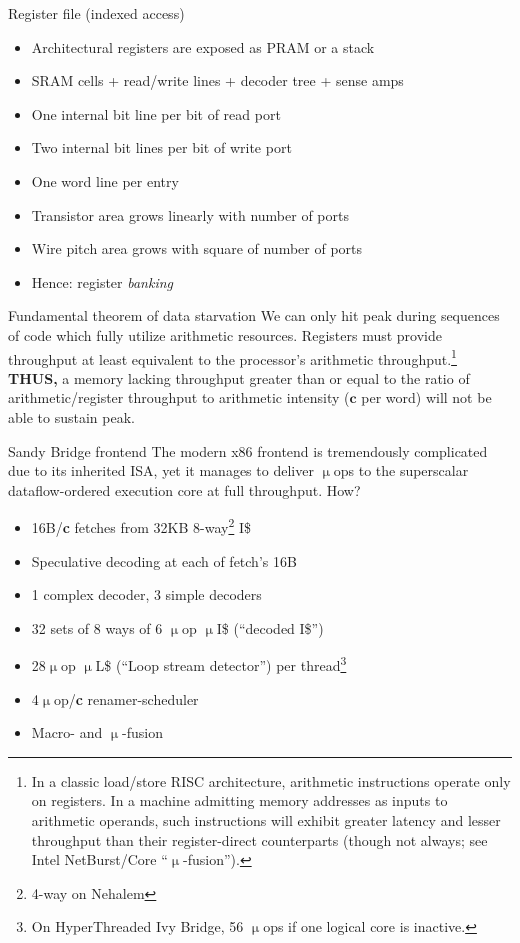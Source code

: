 \documentclass[mathserif,xcolor={dvipsnames,table}]{beamer}
\begin{document}
\begin{frame}{Register file (indexed access)}
\begin{itemize}
\item Architectural registers are exposed as PRAM or a stack
\item SRAM cells + read/write lines + decoder tree + sense amps
\item One internal bit line per bit of read port
\item Two internal bit lines per bit of write port
\item One word line per entry
\item Transistor area grows linearly with number of ports
\item Wire pitch area grows with square of number of ports
\item Hence: register \textit{banking}
\end{itemize}
\end{frame}

\begin{frame}{Fundamental theorem of data starvation}
We can only hit peak during sequences of code which fully
utilize arithmetic resources. Registers must provide throughput
at least equivalent to the processor's arithmetic throughput.\footnote{\tiny{In a classic load/store RISC architecture, arithmetic instructions operate
only on registers. In a machine admitting memory addresses as inputs to
arithmetic operands, such instructions will exhibit greater latency and lesser throughput
than their register-direct counterparts (though not always; see Intel NetBurst/Core ``$\upmu$-fusion'').}}\\
\vspace{.35in}
\textbf{THUS,} a memory lacking throughput greater than or equal to the ratio of
arithmetic/register throughput to arithmetic intensity ($\textbf{c}$ per word) will not be able
to sustain peak.
\end{frame}

\begin{frame}{Sandy Bridge frontend}
The modern x86 frontend is tremendously complicated due to its inherited ISA,
yet it manages to deliver $\upmu$ops to the superscalar dataflow-ordered
execution core at full throughput. How?
\vfill
\begin{itemize}
\item 16B/\textbf{c} fetches from 32KB 8-way\footnote{4-way on Nehalem} I\$
\item Speculative decoding at each of fetch's 16B
\item 1 complex decoder, 3 simple decoders
\item 32 sets of 8 ways of 6 $\upmu$op $\upmu$I\$ (``decoded I\$'')
\item 28$\upmu$op $\upmu$L\$ (``Loop stream detector'') per thread\footnote{On HyperThreaded Ivy Bridge, 56 $\upmu$ops if one logical core is inactive.}
\item 4$\upmu$op/\textbf{c} renamer-scheduler
\item Macro- and $\upmu$-fusion
\end{itemize}
\end{frame}
\end{document}
